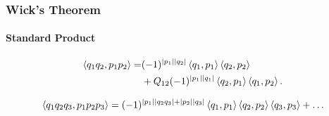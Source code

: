 \documentclass{beamer}
\begin{document}
\begin{frame}

\frametitle{Wick's Theorem}

\framesubtitle{Standard Product}




\begin{align*}
\left\langle q_1 q_2, p_1 p_2 \right\rangle = &(-1)^{| p_1 | | q_2 |} \left\langle q_1, p_1 \right\rangle \left\langle q_2, p_2 \right\rangle \\
&+ Q_{12} (-1)^{| p_1 | | q_1 |} \left\langle q_2, p_1 \right\rangle \left\langle q_1, p_2 \right\rangle.
\end{align*}



\begin{align*}
\langle q_1 q_2 q_3, p_1 p_2 p_3 \rangle = (-1)^{| p_1 | | q_2 q_3 | + | p_2 | | q_3 |} \left\langle q_1, p_1 \right\rangle \left\langle q_2, p_2 \right\rangle \left\langle q_3, p_3 \right\rangle + \ldots
\end{align*}





\end{frame}
\end{document}

